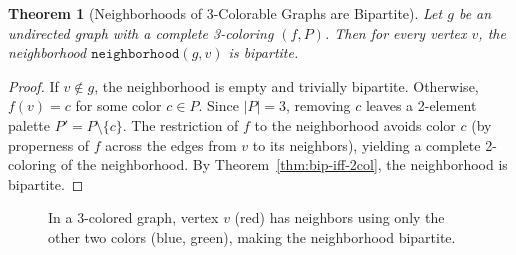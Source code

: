 \documentclass[11pt]{article}
\theoremstyle{plain}
\newtheorem{theorem}{Theorem}[section]
\theoremstyle{definition}
\theoremstyle{remark}
\begin{document}
\begin{theorem}[Neighborhoods of 3-Colorable Graphs are Bipartite]
\label{thm:nbd-bipartite}
Let $g$ be an undirected graph with a complete 3-coloring $(f, P)$. Then for every vertex $v$, the neighborhood $\texttt{neighborhood}(g, v)$ is bipartite.
\end{theorem}

\begin{proof}
If $v \notin g$, the neighborhood is empty and trivially bipartite. Otherwise, $f(v) = c$ for some color $c \in P$. Since $|P| = 3$, removing $c$ leaves a 2-element palette $P' = P \setminus \{c\}$. The restriction of $f$ to the neighborhood avoids color $c$ (by properness of $f$ across the edges from $v$ to its neighbors), yielding a complete 2-coloring of the neighborhood. By Theorem~\ref{thm:bip-iff-2col}, the neighborhood is bipartite.
\end{proof}

\begin{figure}[ht]
\centering
{}
\caption{In a 3-colored graph, vertex $v$ (red) has neighbors using only the other two colors (blue, green), making the neighborhood bipartite.}
\label{fig:nbd-bipartite}
\end{figure}

\end{document}
